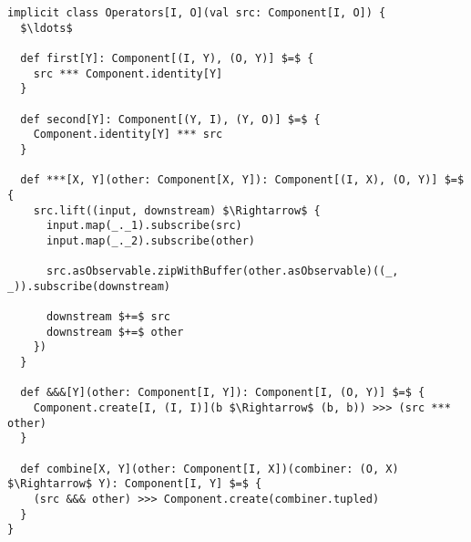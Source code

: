 \begin{minipage}{\linewidth}
\begin{lstlisting}[style=InlineScalaStyle]
implicit class Operators[I, O](val src: Component[I, O]) {
  $\ldots$
  
  def first[Y]: Component[(I, Y), (O, Y)] $=$ {
    src *** Component.identity[Y]
  }

  def second[Y]: Component[(Y, I), (Y, O)] $=$ {
    Component.identity[Y] *** src
  }

  def ***[X, Y](other: Component[X, Y]): Component[(I, X), (O, Y)] $=$ {
    src.lift((input, downstream) $\Rightarrow$ {
      input.map(_._1).subscribe(src)
      input.map(_._2).subscribe(other)

      src.asObservable.zipWithBuffer(other.asObservable)((_, _)).subscribe(downstream)

      downstream $+=$ src
      downstream $+=$ other
    })
  }

  def &&&[Y](other: Component[I, Y]): Component[I, (O, Y)] $=$ {
    Component.create[I, (I, I)](b $\Rightarrow$ (b, b)) >>> (src *** other)
  }

  def combine[X, Y](other: Component[I, X])(combiner: (O, X) $\Rightarrow$ Y): Component[I, Y] $=$ {
    (src &&& other) >>> Component.create(combiner.tupled)
  }
}
\end{lstlisting}
\end{minipage}










































